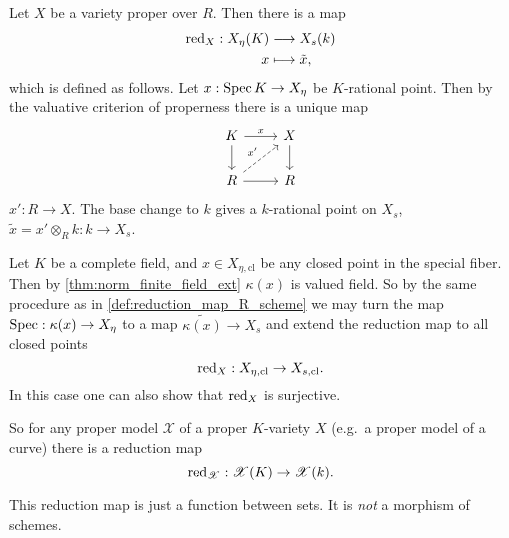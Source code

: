 \begin{definition}\label{def:reduction_map_R_scheme}
	Let $X$ be a variety proper over $R$. 
	Then there is a map 
	\begin{align*}
		\operatorname{red}_X: X_{\eta}(K) &\longrightarrow X_{s}(k) \\
		x &\longmapsto \tilde x
	,\end{align*}
	which is defined as follows. 
	Let $x: \operatorname{Spec} K \to X_\eta$ be $K$-rational point.
	Then by the valuative criterion of properness there is a unique map \[
	\begin{tikzcd}
		K \rar{x} \dar & X \dar \\
		R \rar \ar[dashed]{ur}{x'} & R
	\end{tikzcd}
	\] 
	$x': R \to X$. 
	The base change to $k$ gives a $k$-rational point on $X_s$, $\tilde x = x' \otimes_R k: k \to X_s $.
\end{definition}
\begin{remark}
Let $K$ be a complete field, and $x \in X_{\eta, \text{cl}}$ be any closed point in the special fiber.  Then by \cref{thm:norm_finite_field_ext} $\kappa(x)$ is valued field. 
So by the same procedure as in \cref{def:reduction_map_R_scheme} we may turn the map $\operatorname{Spec}: \kappa(x) \to X_{\eta}$ to a map $\widetilde{\kappa(x)} \to X_s$ and extend the reduction map to all closed points \[
\operatorname{red}_X: X_{\eta, \text{cl}} \to X_{s, \text{cl}}
.\] 
In this case one can also show that $\operatorname{red}_X$ is surjective. 
\end{remark}

So for any proper model $\mathscr X$ of a proper $K$-variety $X$ (e.g.\ a proper model of a curve) there is a reduction map \[
	\operatorname{red}_{\mathscr X}: \mathscr X(K) \to \mathscr X(k)
.\] 

\begin{remark}
	This reduction map is just a function between sets. 
	It is \emph{not} a morphism of schemes. 
\end{remark}
